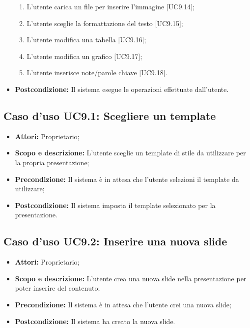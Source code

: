 \begin{itemize}
\begin{enumerate}
		\item L'utente carica un file per inserire l'immagine [UC9.14];
		\item L'utente sceglie la formattazione del testo [UC9.15];
		\item L'utente modifica una tabella [UC9.16];
		\item L'utente modifica un grafico [UC9.17];
		
		\item L'utente inserisce note/parole chiave [UC9.18].
	\end{enumerate}
	\item \textbf{Postcondizione:} Il sistema esegue le operazioni effettuate dall'utente.
\end{itemize}


\subsection{Caso d'uso UC9.1: Scegliere un template}
\begin{itemize}
	\item \textbf{Attori:} Proprietario;
	\item \textbf{Scopo e descrizione:} L'utente sceglie un template di stile da utilizzare per la propria presentazione;
	\item \textbf{Precondizione:} Il sistema è in attesa che l'utente selezioni il template da utilizzare;
	\item \textbf{Postcondizione:} Il sistema imposta il template selezionato per la presentazione.
\end{itemize}


\subsection{Caso d'uso UC9.2: Inserire una nuova slide}
\begin{itemize}
	\item \textbf{Attori:} Proprietario;
	\item \textbf{Scopo e descrizione:} L'utente crea una nuova slide nella presentazione per poter inserire del contenuto;
	\item \textbf{Precondizione:} Il sistema è in attesa che l'utente crei una nuova slide;
	\item \textbf{Postcondizione:} Il sistema ha creato la nuova slide.
\end{itemize}


